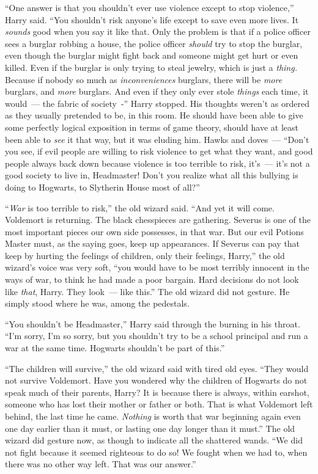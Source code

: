 ``One answer is that you shouldn't ever use violence except to stop violence,'' Harry said. ``You shouldn't risk anyone's life except to save even more lives. It \emph{sounds} good when you say it like that. Only the problem is that if a police officer sees a burglar robbing a house, the police officer \emph{should} try to stop the burglar, even though the burglar might fight back and someone might get hurt or even killed. Even if the burglar is only trying to steal jewelry, which is just a \emph{thing.} Because if nobody so much as \emph{inconveniences} burglars, there will be \emph{more} burglars, and \emph{more} burglars. And even if they only ever stole \emph{things} each time, it would~--- the fabric of society~-'' Harry stopped. His thoughts weren't as ordered as they usually pretended to be, in this room. He should have been able to give some perfectly logical exposition in terms of game theory, should have at least been able to \emph{see} it that way, but it was eluding him. Hawks and doves~--- ``Don't you see, if evil people are willing to risk violence to get what they want, and good people always back down because violence is too terrible to risk, it's~--- it's not a good society to live in, Headmaster! Don't you realize what all this bullying is doing to Hogwarts, to Slytherin House most of all?''

``\emph{War} is too terrible to risk,'' the old wizard said. ``And yet it will come. Voldemort is returning. The black chesspieces are gathering. Severus is one of the most important pieces our own side possesses, in that war. But our evil Potions Master must, as the saying goes, keep up appearances. If Severus can pay that keep by hurting the feelings of children, only their feelings, Harry,'' the old wizard's voice was very soft, ``you would have to be most terribly innocent in the ways of war, to think he had made a poor bargain. Hard decisions do not look like \emph{that}, Harry. They look~--- like this.'' The old wizard did not gesture. He simply stood where he was, among the pedestals.

``You shouldn't be Headmaster,'' Harry said through the burning in his throat. ``I'm sorry, I'm so sorry, but you shouldn't try to be a school principal and run a war at the same time. Hogwarts shouldn't be part of this.''

``The children will survive,'' the old wizard said with tired old eyes. ``They would not survive Voldemort. Have you wondered why the children of Hogwarts do not speak much of their parents, Harry? It is because there is always, within earshot, someone who has lost their mother or father or both. That is what Voldemort left behind, the last time he came. \emph{Nothing} is worth that war beginning again even one day earlier than it must, or lasting one day longer than it must.'' The old wizard did gesture now, as though to indicate all the shattered wands. ``We did not fight because it seemed righteous to do so! We fought when we had to, when there was no other way left. That was our answer.''

